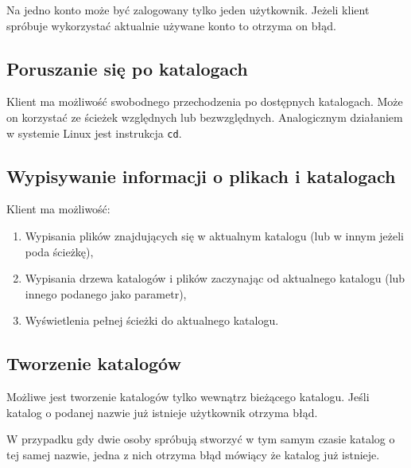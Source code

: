 \documentclass[8pt,a4paper]{article}
\begin{document}
Na jedno konto może być zalogowany tylko jeden użytkownik. Jeżeli klient spróbuje wykorzystać aktualnie używane konto to otrzyma on błąd.

\subsection{Poruszanie się po katalogach}
Klient ma możliwość swobodnego przechodzenia po dostępnych katalogach. Może on korzystać ze ścieżek względnych lub bezwzględnych. Analogicznym działaniem w systemie Linux jest instrukcja \texttt{cd}.

\subsection{Wypisywanie informacji o plikach i katalogach}
\noindent Klient ma możliwość:
\begin{enumerate}
    \item Wypisania plików znajdujących się w aktualnym katalogu (lub w innym jeżeli poda ścieżkę),
    \item Wypisania drzewa katalogów i plików zaczynając od aktualnego katalogu (lub innego podanego jako parametr),
    \item Wyświetlenia pełnej ścieżki do aktualnego katalogu.
\end{enumerate}

\subsection{Tworzenie katalogów}
Możliwe jest tworzenie katalogów tylko wewnątrz bieżącego katalogu. Jeśli katalog o podanej nazwie już istnieje użytkownik otrzyma błąd.

W przypadku gdy dwie osoby spróbują stworzyć w tym samym czasie katalog o tej samej nazwie, jedna z nich otrzyma błąd mówiący że katalog już istnieje.
\end{document}
